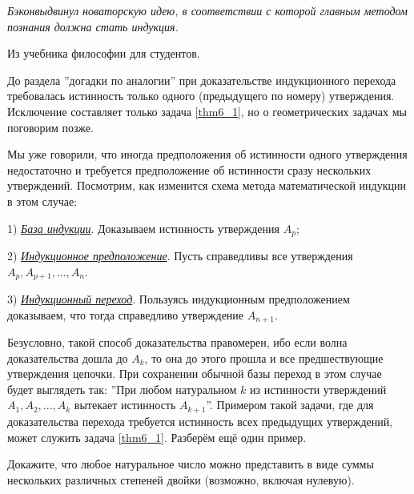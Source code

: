 \epigraph{\textit{Бэкон\footnotemark выдвинул новаторскую идею, в
соответствии с которой главным методом познания должна стать индукция.}}{Из учебника философии для студентов.}
До раздела ''догадки по аналогии'' при доказательстве индукционного перехода требовалась истинность только одного (предыдущего по номеру) утверждения. Исключение составляет только задача \ref{thm6_1}, но о геометрических задачах мы поговорим позже.
\par
Мы уже говорили, что иногда предположения об истинности одного утверждения недостаточно и требуется предположение об истинности сразу нескольких утверждений. Посмотрим, как изменится схема метода математической индукции в этом случае:
\par
1) \textit{\underline{База индукции}}. Доказываем истинность утверждения $A_p$;
\par
2) \textit{\underline{Индукционное предположение}}. Пусть справедливы все утверждения $A_p, A_{p+1}, ..., A_n$.
\par
3) \textit{\underline{Индукционный переход}}. Пользуясь индукционным предположением доказываем, что тогда справедливо утверждение $A_{n + 1}$.
\par
Безусловно, такой способ доказательства правомерен, ибо если волна доказательства дошла до $A_k$, то она до этого прошла и все предшествующие утверждения цепочки. При сохранении обычной базы переход в этом случае будет выглядеть так: ''При любом натуральном $k$ из истинности утверждений $A_1, A_2, ..., A_k$ вытекает истинность $A_{k + 1}$''. Примером такой задачи, где для доказательства перехода требуется истинность всех предыдущих утверждений, может служить задача \ref{thm6_1}. Разберём ещё один пример.

\begin{thm}
Докажите, что любое натуральное число можно представить в виде суммы нескольких различных степеней двойки (возможно, включая нулевую).
\end{thm}

